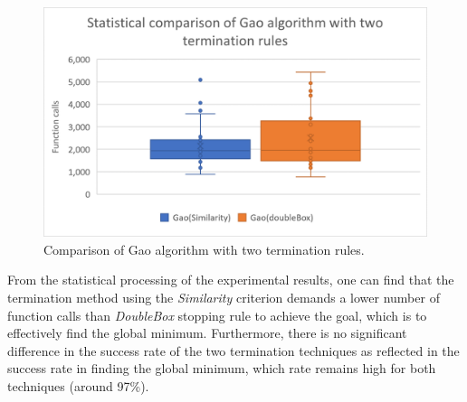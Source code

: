 \documentclass[journal,article,submit,pdftex,moreauthors]{Definitions/mdpi}
\begin{document}
\begin{figure}[H]

\hspace{-5pt}\includegraphics[scale=0.95]{gao_termination.png}
\caption{Comparison of Gao algorithm with two termination rules. \label{fig:twoStop}}
\end{figure}

From the statistical processing of the experimental results, one can find that the termination method using the \textit{Similarity} criterion demands a lower number of function calls than \textit{DoubleBox} stopping rule to achieve the goal, which is to effectively find the global minimum. Furthermore, there is no significant difference in the success rate of the two termination techniques as reflected in the success rate in finding the global minimum, which rate remains high for both techniques (around 97\%).
\end{document}
